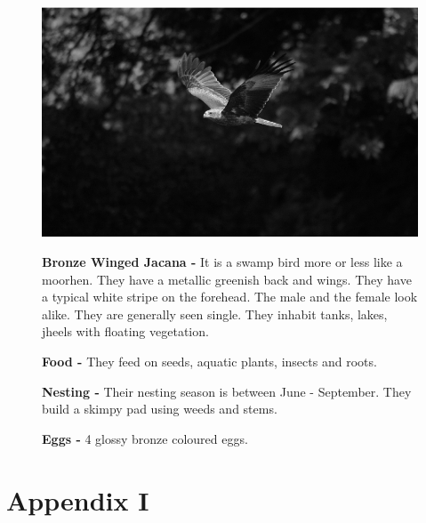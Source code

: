 \begin{figure}[H]
\begin{center}
\includegraphics{figure/Land_birds/01_pariah_kite/pariah-kite.eps}
\end{center}
\medskip
\noindent
{\bf Bronze Winged Jacana -} It is a swamp bird more or less like a moorhen. They have a metallic greenish back and wings. They have a typical white stripe on the forehead. The male and the female look alike. They are generally seen single. They inhabit tanks, lakes, jheels with floating vegetation. 

\medskip
{\bf Food -} They feed on seeds, aquatic plants, insects and roots.

{\bf Nesting -} Their nesting season is between June - September. They build a skimpy pad using weeds and stems.

{\bf Eggs -} 4 glossy bronze coloured eggs.
\end{figure}

\vfill\eject



\chapter*{Appendix I}


